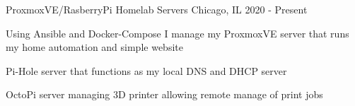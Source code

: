 

\begin{cventries}

  \cventry
    {ProxmoxVE/RasberryPi} %
    {Homelab Servers} %
    {Chicago, IL} %
    {2020 - Present} %
    {
      \begin{cvitems} %
      \item {Using Ansible and Docker-Compose I manage my ProxmoxVE server that runs my home automation and simple website}
      \item {Pi-Hole server that functions as my local DNS and DHCP server}
      \item {OctoPi server managing 3D printer allowing remote manage of print jobs}
      \end{cvitems}
    }

\end{cventries}
